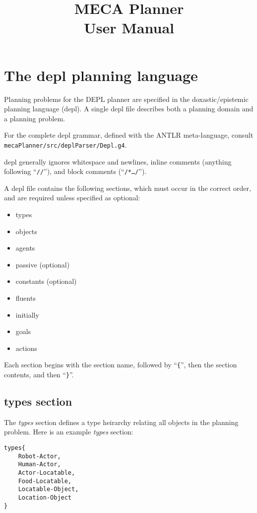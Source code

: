 \documentclass{article}
\title{MECA Planner  \\
User Manual
}
\begin{document}
\maketitle

\section{The depl planning language}

Planning problems for the DEPL planner are specified in the doxastic/epistemic
planning language (depl). A single depl file describes both a planning domain
and a planning problem.

For the complete depl grammar, defined with the ANTLR meta-language, consult
\texttt{mecaPlanner/src/deplParser/Depl.g4}.

depl generally ignores whitespace and newlines, inline comments (anything
following ``\texttt{//}''), and block comments (``\texttt{/*\ldots*/}'').

A depl file contains the following sections, which must occur in the correct
order, and are required unless specified as optional:

\begin{itemize}
\item types
\item objects
\item agents
\item passive (optional)
\item constants (optional)
\item fluents
\item initially
\item goals
\item actions
\end{itemize}

\noindent
Each section begins with the section name, followed by
``\texttt{\{}'', 
then the section contents, and then
``\texttt{\}}''. 


\subsection{types section}

The \emph{types} section defines a type heirarchy relating all objects in the planning
problem.
Here is an example \emph{types} section:
\begin{verbatim}
types{
    Robot-Actor,
    Human-Actor,
    Actor-Locatable,
    Food-Locatable,
    Locatable-Object,
    Location-Object
}
\end{verbatim}
\end{document}
